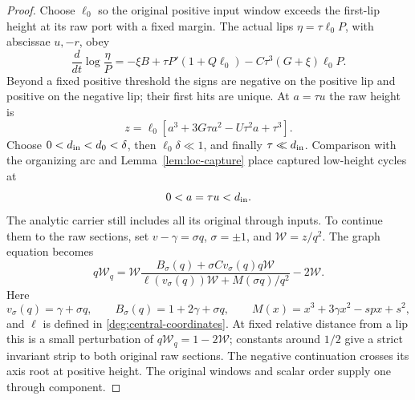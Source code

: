 \begin{proof}
Choose \(\ell_0\) so the original positive input window exceeds the
first-lip height at its raw port with a fixed margin. The actual lips
\(\eta=\tau\ell_0P\), with abscissae \(u,-r\), obey
\begin{equation}\label{deg:compact-lip-speed}
 \frac d{dt}\log\frac\eta P=-\xi B+\tau P'(1+Q\ell_0)
                              -C\tau^3(G+\xi)\ell_0P.
\end{equation}
Beyond a fixed positive threshold the signs are negative on the positive
lip and positive on the negative lip; their first hits are unique. At
\(a=\tau u\) the raw height is
\begin{equation}\label{deg:compact-lip-height}
 z=\ell_0[a^3+3G\tau a^2-U\tau^2a+\tau^3].
\end{equation}
Choose \(0<d_{\rm in}<d_0<\delta\), then \(\ell_0\delta\ll1\),
and finally \(\tau\ll d_{\rm in}\). Comparison with the organizing
arc and Lemma~\ref{lem:loc-capture} place captured low-height cycles at
\begin{equation}\label{deg:compact-raw-range}
                         0<a=\tau u<d_{\rm in}.
\end{equation}
The analytic carrier still includes all its original through inputs.
To continue them to the raw sections, set
\(v-\gamma=\sigma q\), \(\sigma=\pm1\), and
\(\mathcal W=z/q^2\). The graph equation becomes
\begin{equation}\label{deg:compact-raw-corridor}
 q\mathcal W_q=\mathcal W
 \frac{B_\sigma(q)+\sigma Cv_\sigma(q)q\mathcal W}
      {\ell(v_\sigma(q))\mathcal W+M(\sigma q)/q^2}-2\mathcal W.
\end{equation}
Here
\[
 v_\sigma(q)=\gamma+\sigma q,\qquad
 B_\sigma(q)=1+2\gamma+\sigma q,\qquad
 M(x)=x^3+3\gamma x^2-spx+s^2,
\]
and \(\ell\) is defined in \eqref{deg:central-coordinates}.
At fixed relative distance from a lip this is a small perturbation of
\(q\mathcal W_q=1-2\mathcal W\); constants around \(1/2\) give a
strict invariant strip to both original raw sections. The negative
continuation crosses its axis root at positive height. The original
windows and scalar order supply one through component.


\end{proof}
